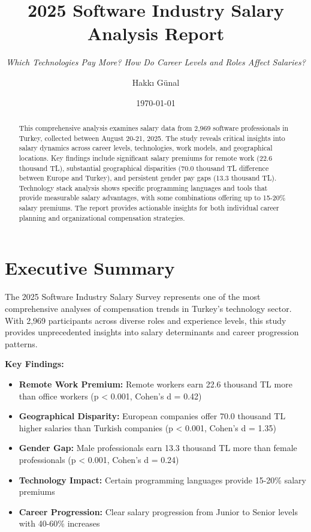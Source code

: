 \documentclass[12pt,a4paper]{article}
\title{\textbf{2025 Software Industry Salary Analysis Report}}
\subtitle{\textit{Which Technologies Pay More? How Do Career Levels and Roles Affect Salaries?}}
\author{Hakkı Günal}
\date{\today}
\begin{document}
\maketitle

\begin{abstract}
This comprehensive analysis examines salary data from 2,969 software professionals in Turkey, collected between August 20-21, 2025. The study reveals critical insights into salary dynamics across career levels, technologies, work models, and geographical locations. Key findings include significant salary premiums for remote work (22.6 thousand TL), substantial geographical disparities (70.0 thousand TL difference between Europe and Turkey), and persistent gender pay gaps (13.3 thousand TL). Technology stack analysis shows specific programming languages and tools that provide measurable salary advantages, with some combinations offering up to 15-20\% salary premiums. The report provides actionable insights for both individual career planning and organizational compensation strategies.
\end{abstract}

\section{Executive Summary}

The 2025 Software Industry Salary Survey represents one of the most comprehensive analyses of compensation trends in Turkey's technology sector. With 2,969 participants across diverse roles and experience levels, this study provides unprecedented insights into salary determinants and career progression patterns.

\textbf{Key Findings:}
\begin{itemize}
    \item \textbf{Remote Work Premium:} Remote workers earn 22.6 thousand TL more than office workers (p < 0.001, Cohen's d = 0.42)
    \item \textbf{Geographical Disparity:} European companies offer 70.0 thousand TL higher salaries than Turkish companies (p < 0.001, Cohen's d = 1.35)
    \item \textbf{Gender Gap:} Male professionals earn 13.3 thousand TL more than female professionals (p < 0.001, Cohen's d = 0.24)
    \item \textbf{Technology Impact:} Certain programming languages provide 15-20\% salary premiums
    \item \textbf{Career Progression:} Clear salary progression from Junior to Senior levels with 40-60\% increases
\end{itemize}
\end{document}
